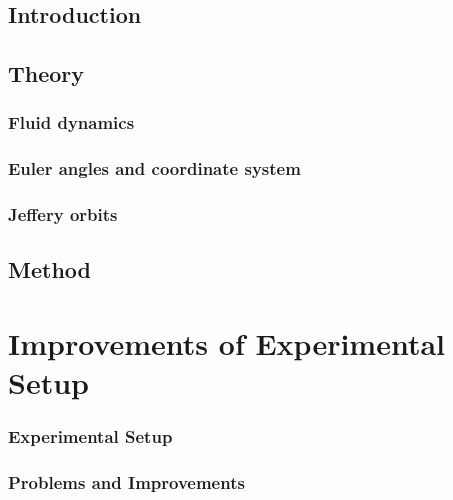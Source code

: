 \documentclass[]{report}
\begin{document}


\doublespacing



\newpage
{}
\setcounter{page}{1}
\pagestyle{fancy}
\setspecialhdr
\tableofcontents


\newpage
\setdefaulthdr
{}	
\setcounter{page}{1}

\chapter{Introduction}



\chapter{Theory}

\section{Fluid dynamics}


\section{Euler angles and coordinate system}


\section{Jeffery orbits}


\chapter{Method}
\part{Improvements of Experimental Setup}
\section{Experimental Setup}

\section{Problems and Improvements}

\end{document}
